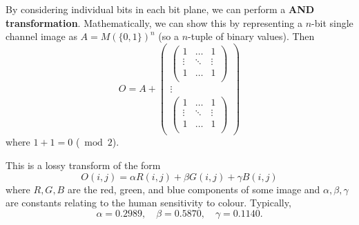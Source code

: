 \begin{definition}
    By considering individual bits in each bit plane, we can perform a \textbf{AND transformation}. Mathematically, we can show this by representing a $n$-bit single channel image as $A = M(\{0, 1\})^n$ (so a $n$-tuple of binary values). Then
    \[ 
        O = A + 
        \begin{pmatrix} 
            \begin{pmatrix} 
                1 & \ldots & 1 \\
                \vdots & \ddots & \vdots \\
                1 & \ldots & 1 \\
            \end{pmatrix} \\
            \vdots \\ 
            \begin{pmatrix} 
                1 & \ldots & 1 \\
                \vdots & \ddots & \vdots \\
                1 & \ldots & 1 \\
            \end{pmatrix}
        \end{pmatrix}
    \]
    where $1 + 1 = 0$ ($\bmod 2$). 
\end{definition}

\begin{example}
    This is a lossy transform of the form
    \[ O(i, j) = \alpha R(i, j) + \beta G(i, j) + \gamma B(i, j) \]
    where $R, G, B$ are the red, green, and blue components of some image and $\alpha, \beta, \gamma$ are constants relating to the human sensitivity to colour. Typically,
    \[ \alpha = 0.2989, \quad \beta = 0.5870, \quad \gamma = 0.1140. \]
\end{example}
